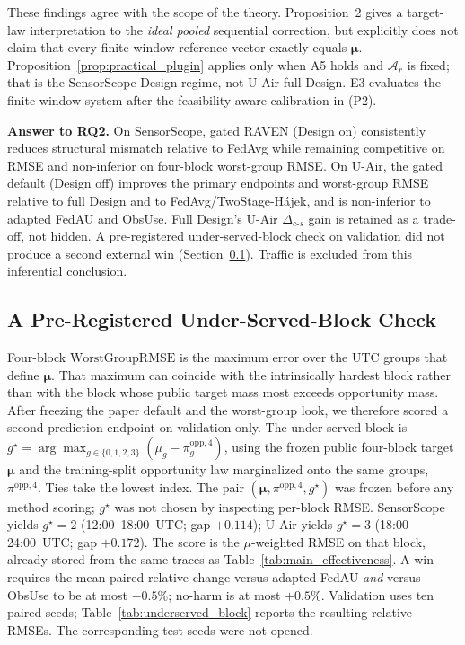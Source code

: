 \documentclass[letterpaper,journal]{IEEEtran}
\begin{document}
These findings agree with the scope of the theory.  Proposition~2 gives
a target-law interpretation to the \emph{ideal pooled} sequential correction,
but explicitly does not claim that every finite-window reference vector exactly
equals $\boldsymbol{\mu}$.  Proposition~\ref{prop:practical_plugin}
applies only when A5 holds and $\mathcal{A}_r$ is fixed; that is the
SensorScope Design regime, not U-Air full Design.  E3 evaluates the
finite-window system after the feasibility-aware calibration in (P2).

\noindent\textbf{Answer to RQ2.}
On SensorScope, gated RAVEN (Design on) consistently reduces structural
mismatch relative to FedAvg while remaining competitive on RMSE and
non-inferior on four-block worst-group RMSE.  On U-Air, the gated
default (Design off) improves the primary endpoints and worst-group
RMSE relative to full Design and to FedAvg/TwoStage-H\'ajek, and is
non-inferior to adapted FedAU and ObsUse.  Full Design's U-Air
$\Delta_{c\text{-}s}$ gain is retained as a trade-off, not hidden.
A pre-registered under-served-block check on validation did not produce
a second external win (Section~\ref{subsec:eval_underserved}).
Traffic is excluded from this inferential conclusion.

\subsection{A Pre-Registered Under-Served-Block Check}
\label{subsec:eval_underserved}

Four-block $\mathrm{WorstGroupRMSE}$ is the maximum error over the UTC
groups that define $\boldsymbol\mu$.  That maximum can coincide with the
intrinsically hardest block rather than with the block whose public
target mass most exceeds opportunity mass.  After freezing the paper
default and the worst-group look, we therefore scored a second
prediction endpoint on validation only.  The under-served block is
$g^{\star}=\arg\max_{g\in\{0,1,2,3\}}
(\mu_g-\pi^{\mathrm{opp},4}_g)$,
using the frozen public four-block target $\boldsymbol\mu$ and the
training-split opportunity law marginalized onto the same groups,
$\pi^{\mathrm{opp},4}$.  Ties take the lowest index.  The pair
$(\boldsymbol\mu,\pi^{\mathrm{opp},4},g^{\star})$ was frozen before any
method scoring; $g^{\star}$ was not chosen by inspecting per-block RMSE.
SensorScope yields $g^{\star}=2$ (12:00--18:00~UTC; gap $+0.114$);
U-Air yields $g^{\star}=3$ (18:00--24:00~UTC; gap $+0.172$).  The score
is the $\mu$-weighted RMSE on that block, already stored from the same
traces as Table~\ref{tab:main_effectiveness}.  A win requires the mean
paired relative change versus adapted FedAU \emph{and} versus ObsUse to
be at most $-0.5\%$; no-harm is at most $+0.5\%$.  Validation uses ten
paired seeds; Table~\ref{tab:underserved_block} reports the resulting
relative RMSEs.  The corresponding test seeds were not opened.
\end{document}
